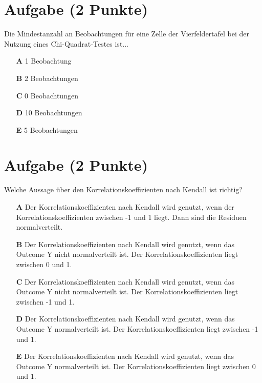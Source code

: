 \documentclass[a4paper, 10pt]{scrartcl}\usepackage[]{graphicx}\usepackage[]{xcolor}
\begin{document}
\section{Aufgabe \hfill (2 Punkte)}

Die Mindestanzahl an Beobachtungen f{\"u}r eine Zelle der Vierfeldertafel bei
der Nutzung eines Chi-Quadrat-Testes ist...



\begin{enumerate}
\item [\textbf{A} \msquare] 1 Beobachtung
\item [\textbf{B} \msquare] 2 Beobachtungen
\item [\textbf{C} \msquare] 0 Beobachtungen
\item [\textbf{D} \msquare] 10 Beobachtungen
\item [\textbf{E} \msquare] 5 Beobachtungen
\end{enumerate} 

\section{Aufgabe \hfill (2 Punkte)}




Welche Aussage {\"u}ber den Korrelationskoeffizienten nach Kendall
ist richtig?



\begin{enumerate}
\item [\textbf{A} \msquare] Der Korrelationskoeffizienten nach Kendall wird genutzt, wenn der Korrelationskoeffizienten zwischen -1 und 1 liegt. Dann sind die Residuen normalverteilt.
\item [\textbf{B} \msquare] Der Korrelationskoeffizienten nach Kendall wird genutzt, wenn das Outcome Y nicht normalverteilt ist. Der Korrelationskoeffizienten liegt zwischen 0 und 1.
\item [\textbf{C} \msquare] Der Korrelationskoeffizienten nach Kendall wird genutzt, wenn das Outcome Y nicht normalverteilt ist. Der Korrelationskoeffizienten liegt zwischen -1 und 1.
\item [\textbf{D} \msquare] Der Korrelationskoeffizienten nach Kendall wird genutzt, wenn das Outcome Y normalverteilt ist. Der Korrelationskoeffizienten liegt zwischen -1 und 1.
\item [\textbf{E} \msquare] Der Korrelationskoeffizienten nach Kendall wird genutzt, wenn das Outcome Y normalverteilt ist. Der Korrelationskoeffizienten liegt zwischen 0 und 1.
\end{enumerate} 
\end{document}
